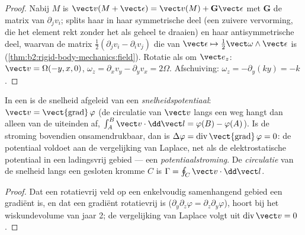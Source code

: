 \begin{proof}
Nabij $M$ is
$\vect v(M + \vect\epsilon) = \vect v(M) + \mathbf G\vect\epsilon$ met
$\mathbf G$ de matrix van $\partial_jv_i$; splits haar in haar symmetrische
deel (een zuivere vervorming, die het element rekt zonder het als geheel te
draaien) en haar antisymmetrische deel, waarvan de matrix
$\tfrac12(\partial_jv_i -
\partial_iv_j)$ die van
$\vect\epsilon \mapsto \tfrac12\vect\omega\wedge\vect\epsilon$ is
(\cref{thm:b2:rigid-body-mechanics:field}). Rotatie als  om
$\vect e_z$: $\vect v = \Omega(-y, x, 0)$,
$\omega_z = \partial_xv_y - \partial_yv_x = 2\Omega$. Afschuiving:
$\omega_z = -\partial_y(ky) = -k$.
\end{proof}

\begin{definition}\label{def:b2:fluid-kinematics:potential}
In een  is de snelheid afgeleid van een
\emph{snelheidspotentiaal}: $\vect v = \operatorname{\vect{grad}}\varphi$
(de circulatie van $\vect v$ langs een weg hangt dan alleen van de uiteinden
af, $\int_A^B\vect v
\cdot\dd\vect l = \varphi(B) - \varphi(A)$). Is de
stroming bovendien onsamendrukbaar, dan is
$\Delta\varphi = \operatorname{div}\operatorname{\vect{grad}}
\varphi = 0$:
de potentiaal voldoet aan de vergelijking van Laplace, net als de
elektrostatische potentiaal in een ladingsvrij gebied --- een
\emph{potentiaalstroming}. De \emph{circulatie} van de snelheid langs een
gesloten kromme $C$ is $\Gamma = \oint_C\vect v\cdot\dd\vect l$.
\end{definition}

\begin{proof}
Dat een rotatievrij veld op een enkelvoudig samenhangend gebied een gradiënt
is, en dat een gradiënt rotatievrij is
($\partial_y\partial_z\varphi = \partial_z\partial_y\varphi$), hoort bij het
wiskundevolume van jaar 2; de vergelijking van Laplace volgt uit
$\operatorname{div}\vect v = 0$.
\end{proof}

